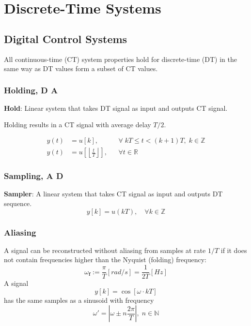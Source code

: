 \section{Discrete-Time Systems}
\subsection{Digital Control Systems}
All continuous-time (CT) system properties hold for discrete-time (DT) in the same way as DT values form a subset of CT values.
\subsubsection{Holding, D \textrightarrow{} A}
\textbf{Hold}: Linear system that takes DT signal as input and outputs CT signal.

Holding results in a CT signal with average delay $T/2$.
\newpar{}

\begin{align*}
    y(t) & =u[k],                                                &  & \forall \; kT \le t < (k+1)T, \;k \in \mathbb{Z} \\
    y(t) & =u\left[\left\lfloor \frac{t}{T}\right\rfloor\right], &  & \forall t \in \mathbb{R}
\end{align*}

\subsubsection{Sampling, A \textrightarrow{} D}
\textbf{Sampler}: A linear system that takes CT signal as input and outputs DT sequence.
\begin{equation*}
    y[k]=u(kT),\quad\forall k\in\mathbb{Z}
\end{equation*}

\subsubsection{Aliasing}

A signal can be reconstructed without aliasing from samples at rate $1/T$ if it does not contain frequencies higher than the Nyquist (folding) frequency:
\begin{equation*}
    \omega_{\mathbf{f}}:=\frac\pi T[rad/s]=\frac1{2T}[Hz]
\end{equation*}
A signal
\begin{equation*}
    y[k]=\cos[\omega\cdot kT]
\end{equation*}
has the same samples as a sinusoid with frequency
\begin{equation*}
    \omega'=\left|\omega\pm n\frac{2\pi}{T}\right|,\; n\in\mathbb{N}
\end{equation*}

